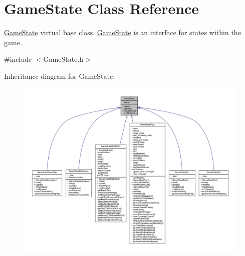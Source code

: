 \hypertarget{class_game_state}{\section{Game\+State Class Reference}
\label{class_game_state}
}


\hyperlink{class_game_state}{Game\+State} virtual base class. \hyperlink{class_game_state}{Game\+State} is an interface for states within the game.  




{\ttfamily \#include $<$Game\+State.\+h$>$}



Inheritance diagram for Game\+State\+:\nopagebreak
\begin{figure}[H]
\begin{center}
\leavevmode
\includegraphics[width=350pt]{class_game_state__inherit__graph}
\end{center}
\end{figure}


